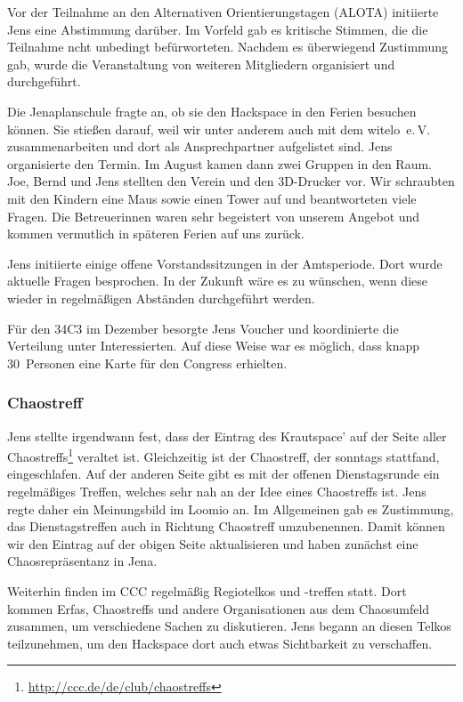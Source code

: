 \documentclass[ngerman]{scrartcl}
\begin{document}
Vor der Teilnahme an den Alternativen Orientierungstagen (ALOTA) initiierte Jens
eine Abstimmung darüber. Im Vorfeld gab es kritische Stimmen, die die Teilnahme
ncht unbedingt befürworteten. Nachdem es überwiegend Zustimmung gab, wurde die
Veranstaltung von weiteren Mitgliedern organisiert und durchgeführt.

Die Jenaplanschule fragte an, ob sie den Hackspace in den Ferien besuchen
können. Sie stießen darauf, weil wir unter anderem auch mit dem
witelo~e.\,V. zusammenarbeiten und dort als Ansprechpartner aufgelistet
sind. Jens organisierte den Termin. Im August kamen dann zwei Gruppen in den
Raum. Joe, Bernd und Jens stellten den Verein und den 3D-Drucker vor. Wir
schraubten mit den Kindern eine Maus sowie einen Tower auf und beantworteten
viele Fragen. Die Betreuerinnen waren sehr begeistert von unserem Angebot und
kommen vermutlich in späteren Ferien auf uns zurück.

Jens initiierte einige offene Vorstandssitzungen in der Amtsperiode. Dort wurde
aktuelle Fragen besprochen. In der Zukunft wäre es zu wünschen, wenn diese
wieder in regelmäßigen Abständen durchgeführt werden.

Für den 34C3 im Dezember besorgte Jens Voucher und koordinierte die Verteilung
unter Interessierten. Auf diese Weise war es möglich, dass knapp 30~Personen
eine Karte für den Congress erhielten.


\subsubsection{Chaostreff}
\label{sec:ct}

Jens stellte irgendwann fest, dass der Eintrag des Krautspace' auf der Seite
aller Chaostreffs\footnote{\url{http://ccc.de/de/club/chaostreffs}} veraltet
ist. Gleichzeitig ist der Chaostreff, der sonntags stattfand, eingeschlafen. Auf
der anderen Seite gibt es mit der offenen Dienstagsrunde ein regelmäßiges
Treffen, welches sehr nah an der Idee eines Chaostreffs ist. Jens regte daher
ein Meinungsbild im Loomio an. Im Allgemeinen gab es Zustimmung, das
Dienstagstreffen auch in Richtung Chaostreff umzubenennen. Damit können wir den
Eintrag auf der obigen Seite aktualisieren und haben zunächst eine
Chaosrepräsentanz in Jena.

Weiterhin finden im CCC regelmäßig Regiotelkos und -treffen statt. Dort kommen
Erfas, Chaostreffs und andere Organisationen aus dem Chaosumfeld zusammen, um
verschiedene Sachen zu diskutieren. Jens begann an diesen Telkos teilzunehmen,
um den Hackspace dort auch etwas Sichtbarkeit zu verschaffen.
\end{document}
